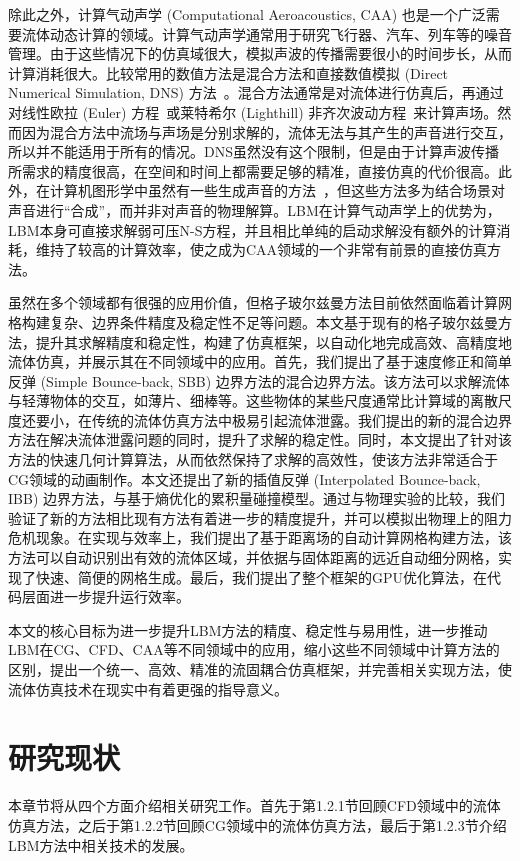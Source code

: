 除此之外，计算气动声学 (Computational Aeroacoustics, CAA) 也是一个广泛需要流体动态计算的领域。计算气动声学通常用于研究飞行器、汽车、列车等的噪音管理。由于这些情况下的仿真域很大，模拟声波的传播需要很小的时间步长，从而计算消耗很大。比较常用的数值方法是混合方法和直接数值模拟 (Direct Numerical Simulation, DNS) 方法~\cite{doi:10.2514/1.15993}。混合方法通常是对流体进行仿真后，再通过对线性欧拉 (Euler) 方程~\cite{doi:10.1080/10618560410001673498,Bogey:2002:1610-1928:463,doi:10.2514/1.18933}或莱特希尔 (Lighthill) 非齐次波动方程~\cite{doi:10.1098/rspa.1952.0060}来计算声场。然而因为混合方法中流场与声场是分别求解的，流体无法与其产生的声音进行交互，所以并不能适用于所有的情况。DNS虽然没有这个限制，但是由于计算声波传播所需求的精度很高，在空间和时间上都需要足够的精准，直接仿真的代价很高。此外，在计算机图形学中虽然有一些生成声音的方法~\cite{10.1145/2897826.2927375}，但这些方法多为结合场景对声音进行“合成”，而并非对声音的物理解算。LBM在计算气动声学上的优势为，LBM本身可直接求解弱可压N-S方程，并且相比单纯的启动求解没有额外的计算消耗，维持了较高的计算效率，使之成为CAA领域的一个非常有前景的直接仿真方法。

虽然在多个领域都有很强的应用价值，但格子玻尔兹曼方法目前依然面临着计算网格构建复杂、边界条件精度及稳定性不足等问题。本文基于现有的格子玻尔兹曼方法，提升其求解精度和稳定性，构建了仿真框架，以自动化地完成高效、高精度地流体仿真，并展示其在不同领域中的应用。首先，我们提出了基于速度修正和简单反弹 (Simple Bounce-back, SBB) 边界方法的混合边界方法。该方法可以求解流体与轻薄物体的交互，如薄片、细棒等。这些物体的某些尺度通常比计算域的离散尺度还要小，在传统的流体仿真方法中极易引起流体泄露。我们提出的新的混合边界方法在解决流体泄露问题的同时，提升了求解的稳定性。同时，本文提出了针对该方法的快速几何计算算法，从而依然保持了求解的高效性，使该方法非常适合于CG领域的动画制作。本文还提出了新的插值反弹 (Interpolated Bounce-back, IBB) 边界方法，与基于熵优化的累积量碰撞模型。通过与物理实验的比较，我们验证了新的方法相比现有方法有着进一步的精度提升，并可以模拟出物理上的阻力危机现象。在实现与效率上，我们提出了基于距离场的自动计算网格构建方法，该方法可以自动识别出有效的流体区域，并依据与固体距离的远近自动细分网格，实现了快速、简便的网格生成。最后，我们提出了整个框架的GPU优化算法，在代码层面进一步提升运行效率。

本文的核心目标为进一步提升LBM方法的精度、稳定性与易用性，进一步推动LBM在CG、CFD、CAA等不同领域中的应用，缩小这些不同领域中计算方法的区别，提出一个统一、高效、精准的流固耦合仿真框架，并完善相关实现方法，使流体仿真技术在现实中有着更强的指导意义。


\section{研究现状}
本章节将从四个方面介绍相关研究工作。首先于第1.2.1节回顾CFD领域中的流体仿真方法，之后于第1.2.2节回顾CG领域中的流体仿真方法，最后于第1.2.3节介绍LBM方法中相关技术的发展。


